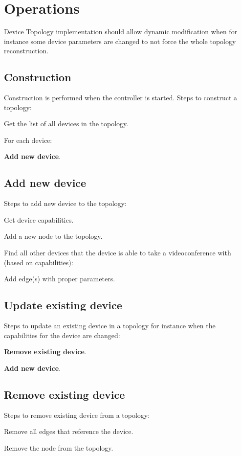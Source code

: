 \section{Operations}

Device Topology implementation should allow dynamic modification when for 
instance some device parameters are changed to not force the whole topology 
reconstruction.      
      
\subsection*{Construction}

Construction is performed when the controller is started. Steps to construct a 
topology:

\begin{compactenum}
\item Get the list of all devices in the topology.
\item For each device: 
  \begin{compactitem}
  \item \textbf{Add new device}.
  \end{compactitem}
\end{compactenum}     

\subsection*{Add new device}     

Steps to add new device to the topology:
\begin{compactenum}
\item Get device capabilities.
\item Add a new node to the topology.
\item Find all other devices that the device is able to take a videoconference 
  with (based on capabilities):
  \begin{compactitem}
  \item Add edge(s) with proper parameters.
  \end{compactitem}
\end{compactenum}  

\subsection*{Update existing device}     

Steps to update an existing device in a topology for instance when the capabilities for the device are changed:
\begin{compactenum}
\item \textbf{Remove existing device}.
\item \textbf{Add new device}.
\end{compactenum} 
     
\subsection*{Remove existing device}     

Steps to remove existing device from a topology:
\begin{compactenum}
\item Remove all edges that reference the device.
\item Remove the node from the topology.
\end{compactenum}   
